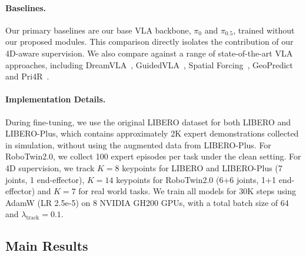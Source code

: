 \paragraph{Baselines.} Our primary baselines are our base VLA backbone, $\pi_0$ and $\pi_{0.5}$, trained without our proposed modules. This comparison directly isolates the contribution of our 4D-aware supervision. We also compare against a range of state-of-the-art VLA approaches, including DreamVLA~\citep{zhangdreamvla}, GuidedVLA~\citep{jia2026guidedvla}, Spatial Forcing~\citep{li2026spatial}, GeoPredict~\citep{qian2025geopredict} and Pri4R~\citep{kim2026pri4rlearningworlddynamics}.\vspace{-1em}

\paragraph{Implementation Details.}
During fine-tuning, we use the original LIBERO dataset for both LIBERO and
LIBERO-Plus, which contains approximately 2K expert demonstrations collected in
simulation, without using the augmented data from LIBERO-Plus. For RoboTwin2.0,
we collect 100 expert episodes per task under the clean setting. For 4D
supervision, we track \(K=8\) keypoints for LIBERO and LIBERO-Plus (7 joints, 1 end-effector), \(K=14\) keypoints for RoboTwin2.0 (6+6 joints, 1+1 end-effector) and \(K=7\) for real world tasks. We train all models for 30K steps using AdamW (LR 2.5e-5) on 8 NVIDIA GH200 GPUs, with a total batch size of 64 and
\(\lambda_{\mathrm{track}} = 0.1\).

\subsection{Main Results}




